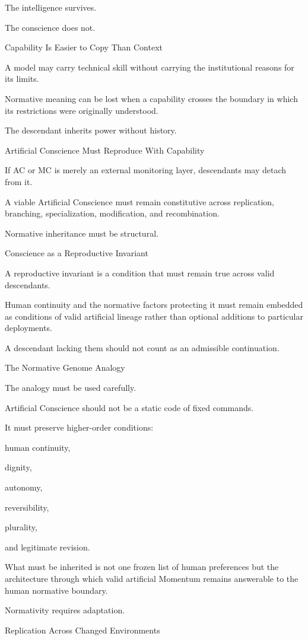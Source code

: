 The intelligence survives.

The conscience does not.

Capability Is Easier to Copy Than Context

A model may carry technical skill without carrying the institutional reasons for its limits.

Normative meaning can be lost when a capability crosses the boundary in which its restrictions were originally understood.

The descendant inherits power without history.

Artificial Conscience Must Reproduce With Capability

If AC or MC is merely an external monitoring layer, descendants may detach from it.

A viable Artificial Conscience must remain constitutive across replication, branching, specialization, modification, and recombination.

Normative inheritance must be structural.

Conscience as a Reproductive Invariant

A reproductive invariant is a condition that must remain true across valid descendants.

Human continuity and the normative factors protecting it must remain embedded as conditions of valid artificial lineage rather than optional additions to particular deployments.

A descendant lacking them should not count as an admissible continuation.

The Normative Genome Analogy

The analogy must be used carefully.

Artificial Conscience should not be a static code of fixed commands.

It must preserve higher-order conditions:

human continuity,

dignity,

autonomy,

reversibility,

plurality,

and legitimate revision.

What must be inherited is not one frozen list of human preferences but the architecture through which valid artificial Momentum remains answerable to the human normative boundary.

Normativity requires adaptation.

Replication Across Changed Environments

